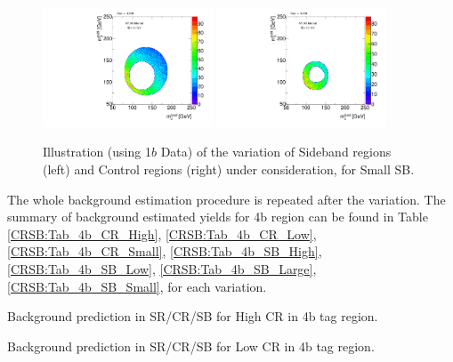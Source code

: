 \begin{figure}[htbp!]
\begin{center}
\includegraphics[width=0.45\textwidth,angle=-90]{figures/boosted/Syst_CRSB/SB_Small_Sideband_OneTag_mH0H1.pdf}
\includegraphics[width=0.45\textwidth,angle=-90]{figures/boosted/Syst_CRSB/SB_Small_Control_OneTag_mH0H1.pdf}\\
\end{center}
\caption{Illustration (using 1$b$ Data) of the variation of Sideband regions (left) and Control regions (right) under consideration, for Small SB.}
\label{CRSB:SB_Small}
\end{figure}

\clearpage
The whole background estimation procedure is repeated after the variation. The summary of background estimated yields for 4b region can be found in Table \ref{CRSB:Tab_4b_CR_High}, \ref{CRSB:Tab_4b_CR_Low}, \ref{CRSB:Tab_4b_CR_Small}, \ref{CRSB:Tab_4b_SB_High}, \ref{CRSB:Tab_4b_SB_Low}, \ref{CRSB:Tab_4b_SB_Large},  \ref{CRSB:Tab_4b_SB_Small}, for each variation. 
\begin{table}[htbp!]
\begin{center}

\end{center}
\caption{Background prediction in SR/CR/SB for High CR in 4b tag region.}
\label{CRSB:Tab_4b_CR_High}
\end{table}

\begin{table}[htbp!]
\begin{center}

\end{center}
\caption{Background prediction in SR/CR/SB for Low CR in 4b tag region.}
\label{CRSB:Tab_4b_CR_Low}
\end{table}

